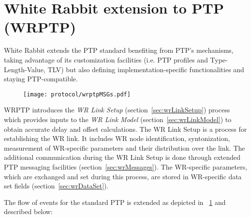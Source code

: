 \section{White Rabbit extension to PTP (WRPTP)}
\label{sec:wrptp}

White Rabbit extends the PTP standard benefiting from PTP's mechanisms, 
taking advantage of its customization facilities (i.e. PTP profiles
and Type-Length-Value, TLV) but also defining implementation-specific 
functionalities and staying PTP-compatible. 


\begin{figure}[!t]
\centering
\texttt{[image: protocol/wrptpMSGs.pdf]}
\caption{}
\label{fig:wrptpMSGs}
\end{figure}

WRPTP introduces the \textit{WR Link Setup} (section~\ref{sec:wrLinkSetup}) process which
provides inputs to the \textit{WR Link  Model} (section~\ref{sec:wrLinkModel}) 
to obtain accurate delay and offset calculations. 
The WR Link Setup is a process for establishing the WR link. It includes WR node
identification, syntonization, measurement of WR-specific parameters and 
their distribution over the link. The additional communication during the WR Link Setup 
is done through extended PTP messaging facilities (section~\ref{sec:wrMessages}). 
The WR-specific parameters, which are exchanged and set during this process, are 
stored in WR-specific data set fields (section~\ref{sec:wrDataSet}). 

The flow of events for the standard PTP is extended as depicted in \figurename~\ref{fig:wrptpMSGs}
and described below:

